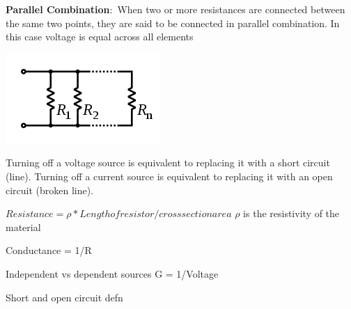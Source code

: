 \documentclass[nobib]{tufte-handout}
\newcommand{\defn}[2]{\noindent\textbf{#1}:\ #2}
\begin{document}
\defn{Parallel Combination}{When two or more resistances are 
connected between the same two points, they are said to be 
connected in parallel combination. In this case voltage is equal
across all elements}

\includegraphics[width=\textwidth/2]{images/220px-Resistors_in_parallel.svg.png}

Turning off a voltage source is equivalent to replacing it with a 
short circuit (line). Turning off a current source is equivalent to replacing it with an
open circuit (broken line). 

$Resistance = \rho * Length of resistor/ cross section area$ $\rho$ is the resistivity of the material 

Conductance = 1/R 

Independent vs dependent sources 
G = 1/Voltage

Short and open circuit defn
\end{document}
